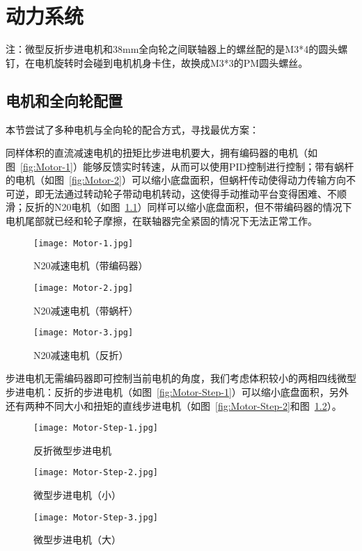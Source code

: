 \chapter{动力系统}
\label{cha:Motor}

注：微型反折步进电机和38mm全向轮之间联轴器上的螺丝配的是M3*4的圆头螺钉，在电机旋转时会碰到电机机身卡住，故换成M3*3的PM圆头螺丝。

\section{电机和全向轮配置}

本节尝试了多种电机与全向轮的配合方式，寻找最优方案：

同样体积的直流减速电机的扭矩比步进电机要大，拥有编码器的电机（如图~\ref{fig:Motor-1}）能够反馈实时转速，从而可以使用PID控制进行控制；带有蜗杆的电机（如图~\ref{fig:Motor-2}）可以缩小底盘面积，但蜗杆传动使得动力传输方向不可逆，即无法通过转动轮子带动电机转动，这使得手动推动平台变得困难、不顺滑；反折的N20电机（如图~\ref{fig:Motor-3}）同样可以缩小底盘面积，但不带编码器的情况下电机尾部就已经和轮子摩擦，在联轴器完全紧固的情况下无法正常工作。

\begin{figure}[htbp]
  \begin{minipage}{0.31\textwidth}
    \centering
    \texttt{[image: Motor-1.jpg]}
    \caption{N20减速电机（带编码器）}
    \label{fig:Motor-1}
  \end{minipage}\hfill
  \begin{minipage}{0.31\textwidth}
    \centering
    \texttt{[image: Motor-2.jpg]}
    \caption{N20减速电机（带蜗杆）}
    \label{fig:Motor-2}
  \end{minipage}\hfill
  \begin{minipage}{0.31\textwidth}
    \centering
    \texttt{[image: Motor-3.jpg]}
    \caption{N20减速电机（反折）}
    \label{fig:Motor-3}
  \end{minipage}
\end{figure}

步进电机无需编码器即可控制当前电机的角度，我们考虑体积较小的两相四线微型步进电机：反折的步进电机（如图~\ref{fig:Motor-Step-1}）可以缩小底盘面积，另外还有两种不同大小和扭矩的直线步进电机（如图~\ref{fig:Motor-Step-2}和图~\ref{fig:Motor-Step-3}）。

\begin{figure}[htbp]
  \begin{minipage}{0.31\textwidth}
    \centering
    \texttt{[image: Motor-Step-1.jpg]}
    \caption{反折微型步进电机}
    \label{fig:Motor-Step-1}
  \end{minipage}\hfill
  \begin{minipage}{0.31\textwidth}
    \centering
    \texttt{[image: Motor-Step-2.jpg]}
    \caption{微型步进电机（小）}
    \label{fig:Motor-Step-2}
  \end{minipage}\hfill
  \begin{minipage}{0.31\textwidth}
    \centering
    \texttt{[image: Motor-Step-3.jpg]}
    \caption{微型步进电机（大）}
    \label{fig:Motor-Step-3}
  \end{minipage}
\end{figure}

